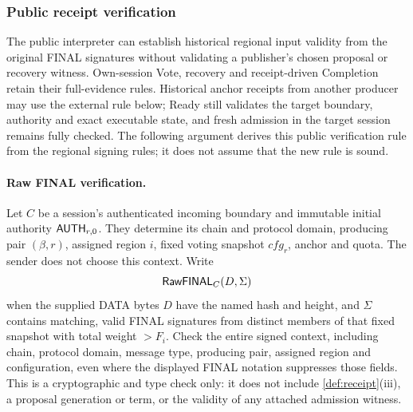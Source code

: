 \subsubsection{Public receipt verification}
\label{sec:receipt-kernel}
The public interpreter can establish historical regional input validity
from the original FINAL signatures without validating a publisher's
chosen proposal or recovery witness. Own-session Vote, recovery and
receipt-driven Completion retain their full-evidence rules. Historical
anchor receipts from another producer may use the external rule below;
Ready still validates the target boundary, authority and exact executable
state, and fresh admission in the target session remains fully checked.
The following argument derives this public verification rule from the
regional signing rules; it does not assume that the new rule is sound.

\paragraph{Raw FINAL verification.}
Let $C$ be a session's authenticated incoming boundary and immutable
initial authority $\mathsf{AUTH}_{r,0}$. They determine its chain and
protocol domain, producing pair $(\beta,r)$, assigned region $i$,
fixed voting snapshot $\mathit{cfg}_r$, anchor and quota. The sender does
not choose this context. Write
\[
 \mathsf{RawFINAL}_C(D,\Sigma)
\]
when the supplied DATA bytes $D$ have the named hash and height, and
$\Sigma$ contains matching, valid FINAL signatures from distinct members
of that fixed snapshot with total weight $>F_i$. Check the entire signed
context, including chain, protocol domain, message type, producing pair,
assigned region and configuration, even where the displayed FINAL
notation suppresses those fields. This is a cryptographic and type
check only: it does not include \cref{def:receipt}(iii), a proposal
generation or term, or the validity of any attached admission witness.

